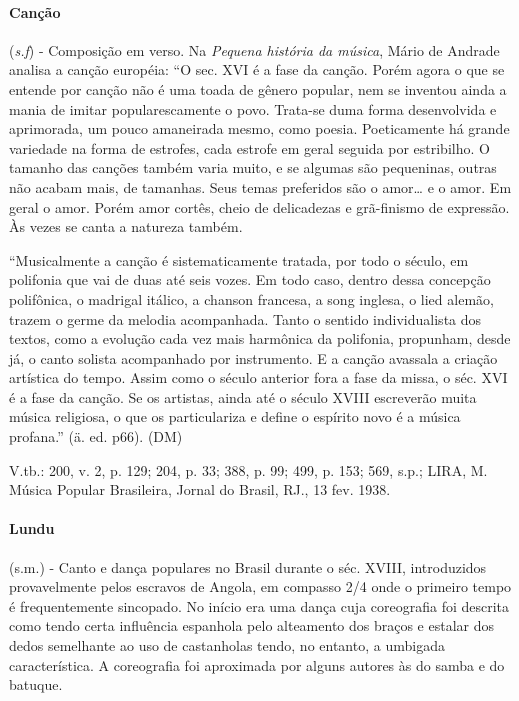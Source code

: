 \paragraph{Canção} (\emph{s.f}) - Composição em verso. Na \emph{Pequena
história da música}, Mário de Andrade analisa a canção européia: ``O
sec. XVI é a fase da canção. Porém agora o que se entende por canção não
é uma toada de gênero popular, nem se inventou ainda a mania de imitar
popularescamente o povo. Trata-se duma forma desenvolvida e aprimorada,
um pouco amaneirada mesmo, como poesia. Poeticamente há grande variedade
na forma de estrofes, cada estrofe em geral seguida por estribilho. O
tamanho das canções também varia muito, e se algumas são pequeninas,
outras não acabam mais, de tamanhas. Seus temas preferidos são o
amor\ldots{} e o amor. Em geral o amor. Porém amor cortês, cheio de
delicadezas e grã-finismo de expressão. Às vezes se canta a natureza
também.

``Musicalmente a canção é sistematicamente tratada, por todo o século,
em polifonia que vai de duas até seis vozes. Em todo caso, dentro dessa
concepção polifônica, o madrigal itálico, a chanson francesa, a song
inglesa, o lied alemão, trazem o germe da melodia acompanhada. Tanto o
sentido individualista dos textos, como a evolução cada vez mais
harmônica da polifonia, propunham, desde já, o canto solista acompanhado
por instrumento. E a canção avassala a criação artística do tempo. Assim
como o século anterior fora a fase da missa, o séc. XVI é a fase da
canção. Se os artistas, ainda até o século XVIII escreverão muita música
religiosa, o que os particulariza e define o espírito novo é a música
profana.'' (ä. ed. p66). (DM)

V.tb.: 200, v. 2, p. 129; 204, p. 33; 388, p. 99; 499, p. 153; 569,
s.p.; LIRA, M. Música Popular Brasileira, Jornal do Brasil, RJ., 13 fev.
1938.

\paragraph{Lundu} (s.m.) - Canto e dança populares no Brasil durante o séc.
XVIII, introduzidos provavelmente pelos escravos de Angola, em compasso
2/4 onde o primeiro tempo é frequentemente sincopado. No início era uma
dança cuja coreografia foi descrita como tendo certa influência
espanhola pelo alteamento dos braços e estalar dos dedos semelhante ao
uso de castanholas tendo, no entanto, a umbigada característica. A
coreografia foi aproximada por alguns autores às do samba e do
batuque.

